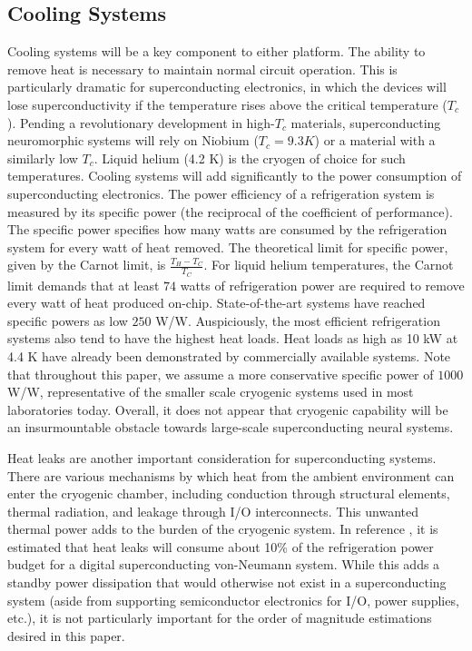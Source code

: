 \documentclass[twocolumn]{article}
\begin{document}
\subsection{Cooling Systems}
Cooling systems will be a key component to either platform. The ability to remove heat is necessary to maintain normal circuit operation. This is particularly dramatic for superconducting electronics, in which the devices will lose superconductivity if the temperature rises above the critical temperature ($T_c$). Pending a revolutionary development in high-$T_c$ materials, superconducting neuromorphic systems will rely on Niobium ($T_c = 9.3K$) or a material with a similarly low $T_c$. Liquid helium (4.2 K) is the cryogen of choice for such temperatures. Cooling systems will add significantly to the power consumption of superconducting electronics. The power efficiency of a refrigeration system is measured by its specific power (the reciprocal of the coefficient of performance). The specific power specifies how many watts are consumed by the refrigeration system for every watt of heat removed. The theoretical limit for specific power, given by the Carnot limit, is $\frac{T_H - T_C}{T_C}$. For liquid helium temperatures, the Carnot limit demands that at least $74$ watts of refrigeration power are required to remove every watt of heat produced on-chip. State-of-the-art systems have reached specific powers as low $250$ W/W. Auspiciously, the most efficient refrigeration systems also tend to have the highest heat loads. Heat loads as high as 10 kW at 4.4 K have already been demonstrated by commercially available systems. Note that throughout this paper, we assume a more conservative specific power of $1000$ W/W, representative of the smaller scale cryogenic systems used in most laboratories today. Overall, it does not appear that cryogenic capability will be an insurmountable obstacle towards large-scale superconducting neural systems.

Heat leaks are another important consideration for superconducting systems. There are various mechanisms by which heat from the ambient environment can enter the cryogenic chamber, including conduction through structural elements, thermal radiation, and leakage through I/O interconnects. This unwanted thermal power adds to the burden of the cryogenic system. In reference \cite{holmes2013energy}, it is estimated that heat leaks will consume about 10\% of the refrigeration power budget for a digital superconducting von-Neumann system. While this adds a standby power dissipation that would otherwise not exist in a superconducting system (aside from supporting semiconductor electronics for I/O, power supplies, etc.), it is not particularly important for the order of magnitude estimations desired in this paper.
\end{document}
